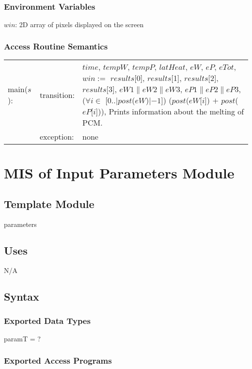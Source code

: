 \documentclass[12pt]{article}
\begin{document}
\subsubsection{Environment Variables}

$win$: 2D array of pixels displayed on the screen

\subsubsection{Access Routine Semantics}

\begin{tabular}{l l p{12cm}}
main($s$): & transition: & $time$, $tempW$, $tempP$, $latHeat$, $eW$, $eP$, $eTot$, $win :=$ $results$[0], $results$[1], $results$[2], $results$[3], $eW1 \| eW2 \| eW3$, $eP1 \| eP2 \| eP3$, ($\forall i \in$ [0..$|post$($eW$)$| - 1$]) ($post$($eW$[$i$]) $+$ $post$($eP$[$i$])), Prints information about the melting of PCM. \\
& exception: & none \\
\end{tabular}

\section{MIS of Input Parameters Module} \label{Parameters}

\subsection{Template Module}

parameters

\subsection{Uses}

N/A

\subsection{Syntax}

\subsubsection{Exported Data Types}

paramT = ?

\subsubsection{Exported Access Programs}
\end{document}
